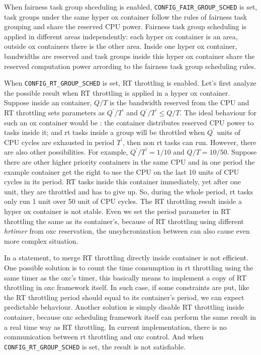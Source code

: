 When fairness task group shceduling is enabled, \texttt{CONFIG\_FAIR\_GROUP\_SCHED} 
is set, task groups under the same 
hyper ox container follow the rules of fairness task grouping and share the 
reserved CPU power. Fairness task group scheduling is applied in different 
areas independently: each hyper ox container is an area, outside ox containers
there is the other area. Inside one hyper ox container, bandwidths are reserved
and task groups inside this hyper ox container share the reserved computation
power arrording to the fairness task group scheduling rules. 

When \texttt{CONFIG\_RT\_GROUP\_SCHED} is set, RT throttling is enabled.
Let's first analyze the possible result when RT throttling is applied in
a hyper ox container. Suppose inside an container, $Q/T$ is the 
bandwidth reserved from the CPU and RT throttling sets parameters as 
$Q^{'}/T^{'}$ and $Q^{'}/T^{'} \le Q/T$. The ideal behaviour for such an
ox container would be : the container distributes reserved CPU power 
to tasks inside it; and rt tasks inside a group will be throttled when
$Q^{'}$ units of CPU cycles are exhausted in period $T^{'}$, then non
rt tasks can run. However, there are also other possibilities.
For example, $Q^{'}/T^{'} = 1/10$ and $Q/T = 10/50$. Suppose there
are other higher priority containers in the same CPU and in one period 
the example container get the right to use the CPU on the last 10 units
of CPU cycles in its period. RT tasks inside this container immediately,
yet after one unit, they are throttled and has to give up. So, during the
whole period, rt tasks only run 1 unit over 50 unit of CPU cycles. The RT
throttling result inside a hyper ox container is not stable. 
Even we set the period parameter in RT throttling the same as its 
container's, because of RT throttling using different \emph{hrtimer} 
from oxc reservation, the unsyhcronization between can also cause even more 
complex situation.

In a statement, to merge RT throttling directly inside container is not efficient.
One possible solution is to count the time consumption in rt throttling using 
the same timer as the oxc's timer, this basically means to implement a copy of RT throttling 
in oxc framework itself. In such case, if some constraints are put, like
the RT throttling period should equal to its container's period, we can
expect predictable behaviour.
Another solution is simply disable RT throttling inside container, because
oxc scheduling framework itself can perform the same result in a real time
way as RT throttling. 
In current implementation, there is no communication between rt throttling
and oxc control. And when \texttt{CONFIG\_RT\_GROUP\_SCHED} is set, the result 
is not satisfiable.

